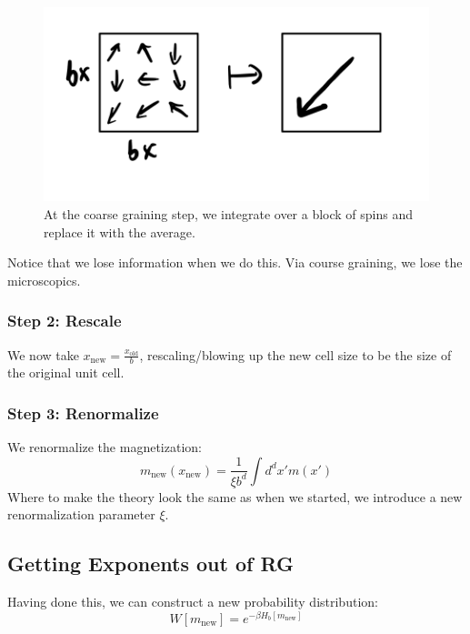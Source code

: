 \begin{figure}[htbp]
    \centering
    \includegraphics[scale=0.5]{Lectures/Figures/blockspins.png}
    \caption{At the coarse graining step, we integrate over a block of spins and replace it with the average.}
    \label{fig:blockspins}
\end{figure}

Notice that we lose information when we do this. Via course graining, we lose the microscopics.

\subsubsection*{Step 2: Rescale}
We now take $x_{\text{new}} = \frac{x_{\text{old}}}{b}$, rescaling/blowing up the new cell size to be the size of the original unit cell.

\subsubsection*{Step 3: Renormalize}
We renormalize the magnetization:
\begin{equation}
    m_{\text{new}}(x_{\text{new}}) = \frac{1}{\xi b^d}\int d^dx'm(x')
\end{equation}
Where to make the theory look the same as when we started, we introduce a new renormalization parameter $\xi$.

\subsection{Getting Exponents out of RG}

Having done this, we can construct a new probability distribution:
\begin{equation}
    W[m_{\text{new}}] = e^{-\beta H_b[m_{\text{new}}]}
\end{equation}

